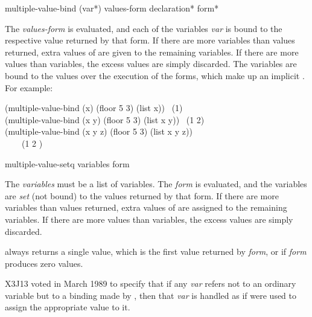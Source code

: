 \begin{defmac}
multiple-value-bind ({var}*) values-form
                    {declaration}* {form}*

The \emph{values-form} is evaluated, and each of the variables \emph{var} is
bound to the respective value returned by that form.  If there are more
variables than values returned, extra values of {\false} are given to the
remaining variables.  If there are more values than variables, the excess
values are simply discarded.  The variables are bound to the values over
the execution of the forms, which make up an implicit .
For example:
\begin{lisp}
(multiple-value-bind (x) (floor 5 3) (list x)) \EV\ (1) \\
(multiple-value-bind (x y) (floor 5 3) (list x y)) \EV\ (1 2) \\
(multiple-value-bind (x y z) (floor 5 3) (list x y z)) \\
~~~\EV\ (1 2 {\false})
\end{lisp}
\end{defmac}

\begin{defmac}
multiple-value-setq variables form

The \emph{variables} must be a list of variables.  The \emph{form} is
evaluated, and the variables are \emph{set} (not bound) to the values
returned by that form.  If there are more variables than values returned,
extra values of {\false} are assigned to the remaining variables.  If there
are more values than variables, the excess values are simply discarded.

 always returns a single value, which is the first
value returned by \emph{form}, or {\false} if \emph{form} produces zero values.

\begin{newer}
X3J13 voted in March 1989
 to specify that if any \emph{var}
refers not to an ordinary variable but to a binding made by
, then that \emph{var} is handled as
if  were used to assign the appropriate value to it.
\end{newer}
\end{defmac}


